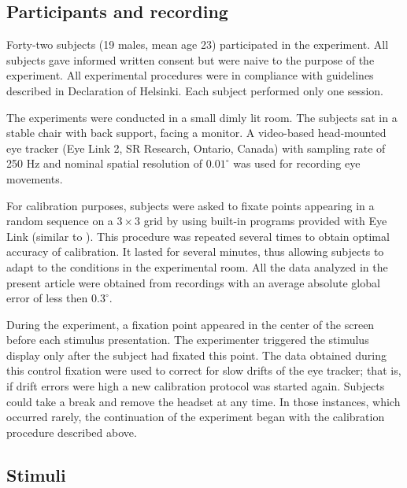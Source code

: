 
\subsection{Participants and recording}

Forty-two subjects (19 males, mean age 23) participated in the experiment.
All subjects gave informed written consent but were naive to the purpose of
the experiment. All experimental procedures were in compliance with
guidelines described in Declaration of Helsinki. Each subject performed
only one session.

The experiments were conducted in a small dimly lit room. The subjects sat
in a stable chair with back support, facing a monitor. A video-based
head-mounted eye tracker (Eye Link 2, SR Research, Ontario, Canada) with
sampling rate of 250 Hz and nominal spatial resolution of $0.01^\circ$ was
used for recording eye movements.

For calibration purposes, subjects were asked to fixate points appearing in
a random sequence on a $3 \times 3$ grid by using built-in programs
provided with Eye Link (similar to \cite{tatler2006a}). This procedure was
repeated several times to obtain optimal accuracy of calibration. It lasted
for several minutes, thus allowing subjects to adapt to the conditions in
the experimental room. All the data analyzed in the present article were
obtained from recordings with an average absolute global error of less then
$0.3^\circ$.

During the experiment, a fixation point appeared in the center of the
screen before each stimulus presentation. The experimenter triggered the
stimulus display only after the subject had fixated this point. The data
obtained during this control fixation were used to correct for slow drifts
of the eye tracker; that is, if drift errors were high a new calibration
protocol was started again. Subjects could take a break and remove the
headset at any time. In those instances, which occurred rarely, the
continuation of the experiment began with the calibration procedure
described above.

\subsection{Stimuli}

